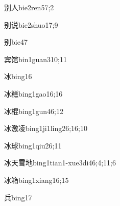 \begin{verbete}{别人}{bie2ren5}{7;2}
\end{verbete}

\begin{verbete}{别说}{bie2shuo1}{7;9}
\end{verbete}

\begin{verbete}{别}{bie4}{7}
\end{verbete}

\begin{verbete}{宾馆}{bin1guan3}{10;11}
\end{verbete}

\begin{verbete}{冰}{bing1}{6}
\end{verbete}

\begin{verbete}{冰糕}{bing1gao1}{6;16}
\end{verbete}

\begin{verbete}{冰棍}{bing1gun4}{6;12}
\end{verbete}

\begin{verbete}{冰激凌}{bing1ji1ling2}{6;16;10}
\end{verbete}

\begin{verbete}{冰球}{bing1qiu2}{6;11}
\end{verbete}

\begin{verbete}{冰天雪地}{bing1tian1-xue3di4}{6;4;11;6}
\end{verbete}

\begin{verbete}{冰箱}{bing1xiang1}{6;15}
\end{verbete}

\begin{verbete}{兵}{bing1}{7}
\end{verbete}

